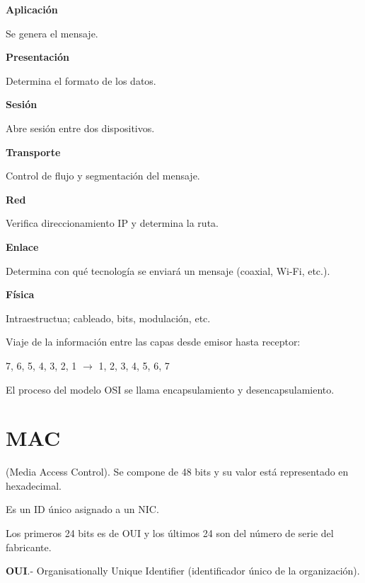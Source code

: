 \documentclass{article}
\begin{document}
\textbf{Aplicación}

Se genera el mensaje.
\vspace{1em}

\textbf{Presentación}

Determina el formato de los datos.
\vspace{1em}

\textbf{Sesión}

Abre sesión entre dos dispositivos.
\vspace{1em}

\textbf{Transporte}

Control de flujo y segmentación del mensaje.
\vspace{1em}

\textbf{Red}

Verifica direccionamiento IP y determina la ruta.
\vspace{1em}

\textbf{Enlace}

Determina con qué tecnología se enviará un mensaje (coaxial, Wi-Fi, etc.).
\vspace{1em}

\textbf{Física}

Intraestructua; cableado, bits, modulación, etc.
\vspace{1em}

Viaje de la información entre las capas desde emisor hasta receptor:

7, 6, 5, 4, 3, 2, 1 $\rightarrow$ 1, 2, 3, 4, 5, 6, 7
\vspace{1em}

El proceso del modelo OSI se llama encapsulamiento y desencapsulamiento.

\section{MAC}
\vspace{1em}

(Media Access Control). Se compone de 48 bits y su valor está representado en
hexadecimal.
\vspace{1em}

Es un ID único asignado a un NIC.
\vspace{1em}

Los primeros 24 bits es de OUI y los últimos 24 son del número de serie del
fabricante.
\vspace{1em}

\textbf{OUI}.- Organisationally Unique Identifier (identificador único de la
organización).
\vspace{1em}
\end{document}
